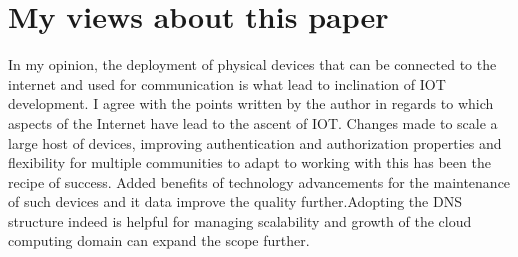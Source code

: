 \documentclass{report}
\begin{document}
    \section*{My views about this paper}
    In my opinion, the deployment of physical devices that can be connected to the internet and used for communication is what lead to inclination of IOT development. I agree with the points written by the author in regards to which aspects of the Internet have lead to the ascent of IOT. Changes made to scale a large host of devices, improving authentication and authorization properties and flexibility for multiple communities to adapt to working with this has been the recipe of success. Added benefits of technology advancements for the maintenance of such devices and it data improve the quality further.Adopting the DNS structure indeed is helpful for managing scalability and growth of the cloud computing domain can expand the scope further.
       
\end{document}
